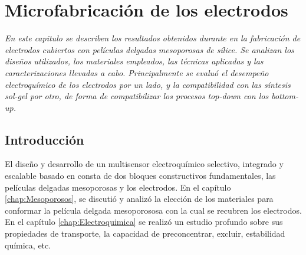  \newcommand{\NoBiblioMicro}[1]{
 \ifthenelse{\equal{#1}{verdadero}}{}{}
 \NoBiblioMicro{verdadero}}

 
 \FormatoCapituloDosLineas
 
 \chapter{Microfabricación de los electrodos}\label{chap:Microfabricacion}

 \thispagestyle{empty}
	
 \noindent\textit{En este capitulo se describen los resultados obtenidos durante en la fabricación de electrodos cubiertos con películas delgadas mesoporosas de sílice. Se analizan los diseños utilizados, los materiales empleados, las técnicas aplicadas y las caracterizaciones llevadas a cabo. Principalmente se evaluó el desempeño electroquímico de los electrodos por un lado, y la compatibilidad con las síntesis sol-gel por otro, de forma de compatibilizar los procesos \textit{top-down }con los \textit{bottom-up.}}
 
 
 \vfill
 \minitoc
 \newpage

\section{Introducción}
	
	El diseño y desarrollo de un multisensor electroquímico selectivo, integrado y escalable basado en \pdm\space consta de dos bloques constructivos fundamentales, las películas delgadas mesoporosas y los electrodos. En el capítulo \ref{chap:Mesoporosos}, se discutió y analizó la elección de los materiales para conformar la película delgada mesoporososa con la cual se recubren los electrodos. En el capítulo \ref{chap:Electroquimica} se realizó un estudio profundo sobre sus propiedades de transporte, la capacidad de preconcentrar, excluir, estabilidad química, etc.

